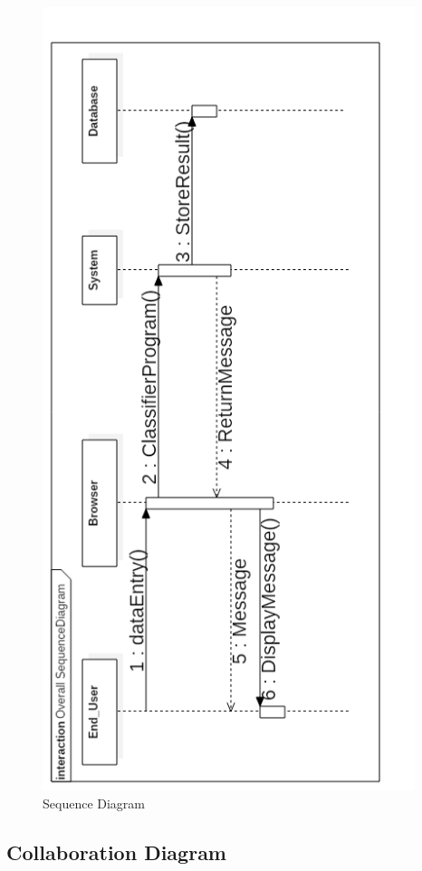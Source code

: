 \begin{figure}[H] %
\begin{center}
	\includegraphics[height = 9in]{images/Sequence.png}
	\caption{Sequence Diagram} %
	\label{Sequence} %
\end{center}
\end{figure}

\newpage
\subsection{Collaboration Diagram}

